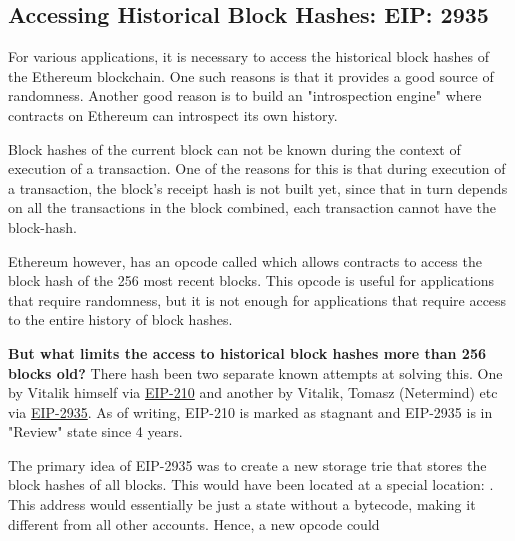\subsection{Accessing Historical Block Hashes: EIP: 2935}
For various applications, it is necessary to access the historical block hashes of the Ethereum blockchain. One such reasons is that it provides a good source of randomness. Another good reason is to build an "introspection engine" where contracts on Ethereum can introspect its own history.

Block hashes of the current block can not be known during the context of execution of a transaction. One of the reasons for this is that during execution of a transaction, the block's receipt hash is not built yet, since that in turn depends on all the transactions in the block combined, each transaction cannot have the block-hash.

Ethereum however, has an opcode called  which allows contracts to access the block hash of the 256 most recent blocks. This opcode is useful for applications that require randomness, but it is not enough for applications that require access to the entire history of block hashes.

\textbf{But what limits the access to historical block hashes more than 256 blocks old?} There hash been two separate known attempts at solving this. One by Vitalik himself via \href{https://eips.ethereum.org/EIPS/eip-210}{EIP-210} and another by Vitalik, Tomasz (Netermind) etc via \href{https://eips.ethereum.org/EIPS/eip-2935}{EIP-2935}. As of writing, EIP-210 is marked as stagnant and EIP-2935 is in "Review" state since 4 years.

The primary idea of EIP-2935 was to create a new storage trie that stores the block hashes of all blocks. This would have been located at a special location: . This address would essentially be just a state without a bytecode, making it different from all other accounts. Hence, a new opcode  could 